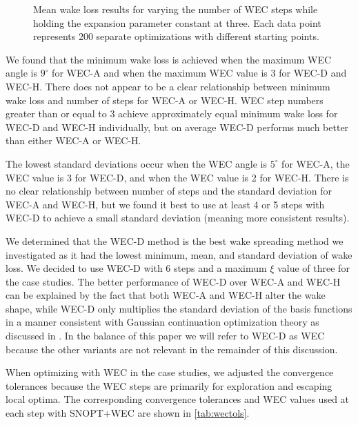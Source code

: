 \documentclass{jpconf}
\begin{document}
\begin{figure}[ht]
\begin{minipage}[t]{0.47\textwidth}
		\caption{Mean wake loss results for varying the number of WEC steps while holding the expansion parameter constant at three. Each data point represents 200 separate optimizations with different starting points.}
		\label{fig:aepmean-ws}
	\end{minipage}
\end{figure}

We found that the minimum wake loss is achieved when the maximum WEC angle is $9^\circ$ for WEC-A and when the maximum WEC value is 3 for WEC-D and WEC-H. There does not appear to be a clear relationship between minimum wake loss and number of steps for WEC-A or WEC-H. WEC step numbers greater than or equal to 3 achieve approximately equal minimum wake loss for WEC-D and WEC-H individually, but on average WEC-D performs much better than either WEC-A or WEC-H.

The lowest standard deviations occur when the WEC angle is $5^\circ$ for WEC-A, the WEC value is 3 for WEC-D, and when the WEC value is 2 for WEC-H. There is no clear relationship between number of steps and the standard deviation for WEC-A and WEC-H, but we found it best to use at least 4 or 5 steps with WEC-D to achieve a small standard deviation (meaning more consistent results).

We determined that the WEC-D method is the best wake spreading method we investigated as it had the lowest minimum, mean, and standard deviation of wake loss. We decided to use WEC-D with 6 steps and a maximum $\xi$ value of three for the case studies. The better performance of WEC-D over WEC-A and WEC-H can be explained by the fact that both WEC-A and WEC-H alter the wake shape, while WEC-D only multiplies the standard deviation of the basis functions in a manner consistent with Gaussian continuation optimization theory as discussed in \cite{mobahi2015}. In the balance of this paper we will refer to WEC-D as WEC because the other variants are not relevant in the remainder of this discussion. 

When optimizing with WEC in the case studies, we adjusted the convergence tolerances because the WEC steps are primarily for exploration and escaping local optima. The corresponding convergence tolerances and WEC values used at each step with SNOPT+WEC are shown in \cref{tab:wectols}. 
\end{document}
